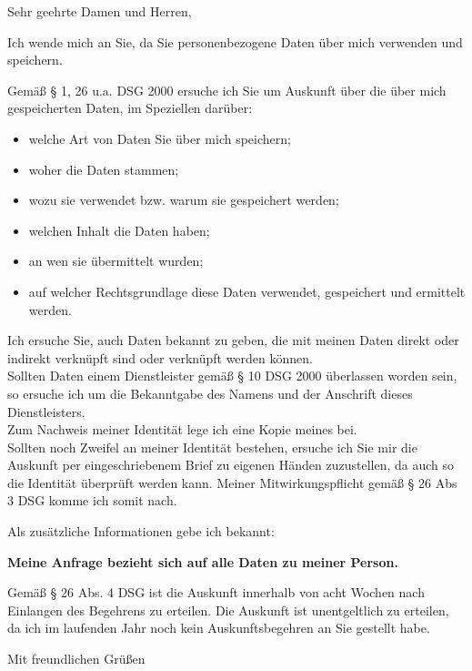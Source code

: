 \documentclass[%
  fontsize=12pt, %
  version=last%
]{scrlttr2}
\begin{document}
\begin{letter}
{
  \ziel{}
}

\opening{Sehr geehrte Damen und Herren,}
Ich wende mich an Sie, da Sie personenbezogene Daten über mich verwenden und speichern.\par
Gemäß § 1, 26 u.a. DSG 2000 ersuche ich Sie um Auskunft über die über mich gespeicherten Daten, im Speziellen darüber:
\begin{itemize}
  \item welche Art von Daten Sie über mich speichern;
  \item woher die Daten stammen;
  \item wozu sie verwendet bzw. warum sie gespeichert werden;
  \item welchen Inhalt die Daten haben;
  \item an wen sie übermittelt wurden;
  \item auf welcher Rechtsgrundlage diese Daten verwendet, gespeichert und ermittelt werden.
\end{itemize}

Ich ersuche Sie, auch Daten bekannt zu geben, die mit meinen Daten direkt oder indirekt verknüpft sind oder verknüpft werden können.\\
Sollten Daten einem Dienstleister gemäß § 10 DSG 2000 überlassen worden sein, so ersuche ich um die Bekanntgabe des Namens und der Anschrift dieses Dienstleisters.\\
Zum Nachweis meiner Identität lege ich eine Kopie meines \ausweis{} bei.\\
Sollten noch Zweifel an meiner Identität bestehen, ersuche ich Sie mir die Auskunft per eingeschriebenem Brief zu eigenen Händen zuzustellen, da auch so die Identität überprüft werden kann.
Meiner Mitwirkungspflicht gemäß § 26 Abs 3 DSG komme ich somit nach.\par

\ifx \zusatzinfo \undefined
\else
Als zusätzliche Informationen gebe ich bekannt: \zusatzinfo{}
\fi

\textbf{Meine Anfrage bezieht sich auf alle Daten zu meiner Person.}\par

Gemäß § 26 Abs. 4 DSG ist die Auskunft innerhalb von acht Wochen nach Einlangen des Begehrens zu erteilen.
Die Auskunft ist unentgeltlich zu erteilen, da ich im laufenden Jahr noch kein Auskunftsbegehren an Sie gestellt habe.

\closing{Mit freundlichen Grüßen}


\end{letter}
\end{document}
